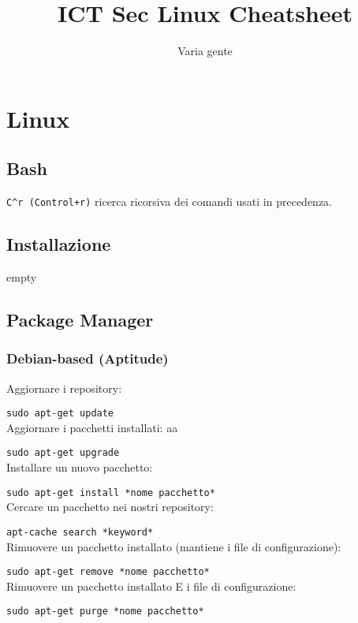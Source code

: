 \documentclass[]{report}
\title{ICT Sec Linux Cheatsheet}
\author{Varia gente}
\begin{document}
\maketitle
\tableofcontents

\chapter{Linux}
\section{Bash}
\verb|C^r (Control+r)| ricerca ricorsiva dei comandi usati in precedenza.\\


\section{Installazione}
empty
\newpage
\section{Package Manager}
\subsection{Debian-based (Aptitude)}
\noindent Aggiornare i repository:

\verb|sudo apt-get update|\\

\noindent Aggiornare i pacchetti installati: aa

\verb|sudo apt-get upgrade|\\

\noindent Installare un nuovo pacchetto:

\verb|sudo apt-get install *nome pacchetto*|\\

\noindent Cercare un pacchetto nei nostri repository:

\verb|apt-cache search *keyword*|\\

\noindent Rimuovere un pacchetto installato (mantiene i file di configurazione):

\verb|sudo apt-get remove *nome pacchetto*|\\

\noindent Rimuovere un pacchetto installato E i file di configurazione:

\verb|sudo apt-get purge *nome pacchetto*|\\
\end{document}
